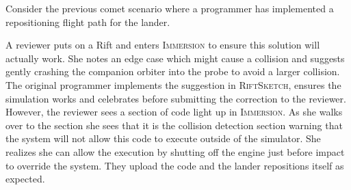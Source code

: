 \documentclass[conference]{IEEEtran}
\begin{document}
Consider the previous comet scenario where a programmer has implemented a repositioning flight path for the lander.

A reviewer puts on a Rift and enters \textsc{Immersion} to ensure this solution will actually work.
She notes an edge case which might cause a collision and suggests gently crashing the companion orbiter into the probe to avoid a larger collision.
The original programmer implements the suggestion in \textsc{RiftSketch}, ensures the simulation works and celebrates before submitting the correction to the reviewer.
However, the reviewer sees a section of code light up in \textsc{Immersion}.
As she walks over to the section she sees that it is the collision detection section warning that the system will not allow this code to execute outside of the simulator.
She realizes she can allow the execution by shutting off the engine just before impact to override the system.
They upload the code and the lander repositions itself as expected.




  




\end{document}

